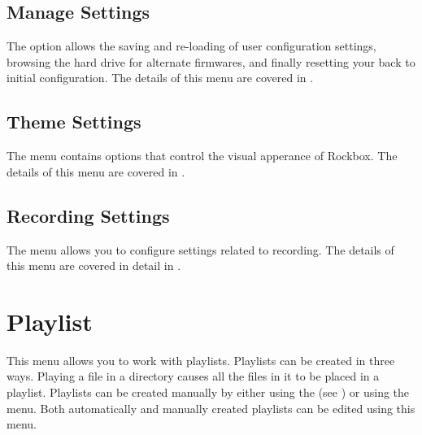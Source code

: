 \subsection{Manage Settings}
The  option allows the saving and re-loading of user 
configuration settings, browsing the hard drive for alternate firmwares, and finally
resetting your \dap{} back to initial configuration.
%
%
The details of this menu are covered in
.

\subsection{Theme Settings}
The  menu contains options that control the visual
apperance of Rockbox. The details of this menu are covered in
.

\subsection{Recording Settings}
The  menu allows you to configure settings related
to recording. The details of this menu are covered in detail in 
.



\section{\label{ref:playlistoptions}Playlist}
  This menu allows you to work with playlists. Playlists can be created in 
  three ways. Playing a file in a directory causes all the files in it
  to be placed in a playlist. Playlists can be created manually by
  either using the   (see ) or using
  the  menu. Both automatically and manually created
  playlists can be edited using this menu.

